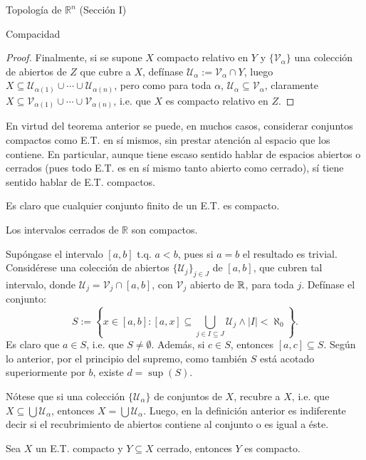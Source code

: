 \begin{chapter}{Topología de $\mathbb{R}^n$ (Sección I)}
\begin{section}{Compacidad}
\begin{proof}
Finalmente, si se supone $X$ compacto relativo en $Y$ y $\{\mathcal{V}_\alpha\}$ una colección de abiertos de $Z$ que cubre a $X$, defínase $\mathcal{U}_\alpha:=\mathcal{V}_\alpha\cap Y$, luego $X\subseteq\mathcal{U}_{\alpha(1)}\cup\cdots\cup\mathcal{U}_{\alpha(n)}$, pero como para toda $\alpha$, $\mathcal{U}_\alpha\subseteq\mathcal{V}_\alpha$, claramente $X\subseteq\mathcal{V}_{\alpha(1)}\cup\cdots\cup\mathcal{V}_{\alpha(n)}$, i.e. que $X$ es compacto relativo en $Z$.
\end{proof}

En virtud del teorema anterior se puede, en muchos casos, considerar conjuntos compactos como E.T. en sí mismos, sin prestar atención al espacio que los contiene. En particular, aunque tiene escaso sentido hablar de espacios abiertos o cerrados (pues todo E.T. es en sí mismo tanto abierto como cerrado), sí tiene sentido hablar de E.T. compactos. 

\begin{exmp}
Es claro que cualquier conjunto finito de un E.T. es compacto. 
\end{exmp}

\begin{exmp}
Los intervalos cerrados de $\mathbb{R}$ son compactos.

Supóngase el intervalo $[a,b]$ t.q. $a<b$, pues si $a=b$ el resultado es trivial. Considérese una colección de abiertos $\{\mathcal{U}_j\}_{j\in J}$ de $[a,b]$, que cubren tal intervalo, donde $\mathcal{U}_j=\mathcal{V}_j\cap[a,b]$, con $\mathcal{V}_j$ abierto de $\mathbb{R}$, para toda $j$. Defínase el conjunto: $$S:=\left\lbrace x\in[a,b]:[a,x]\subseteq\bigcup_{j\in I\subseteq J}\mathcal{U}_j\wedge|I|<\aleph_0\right\rbrace.$$ Es claro que $a\in S$, i.e. que $S\neq\emptyset$. Además, si $c\in S$, entonces $[a,c]\subseteq S$. Según lo anterior, por el principio del supremo, como también $S$ está acotado superiormente por $b$, existe $d=\sup(S)$.
\end{exmp}

\begin{rem}
Nótese que si una colección $\{\mathcal{U}_\alpha\}$ de conjuntos de $X$, recubre a $X$, i.e. que $X\subseteq\bigcup\mathcal{U}_\alpha$, entonces $X=\bigcup\mathcal{U}_\alpha$. Luego, en la definición anterior es indiferente decir si el recubrimiento de abiertos contiene al conjunto o es igual a éste. 
\end{rem}

\begin{them}
Sea $X$ un E.T. compacto y $Y\subseteq X$ cerrado, entonces $Y$ es compacto. 
\end{them}


\end{section}
\end{chapter}
